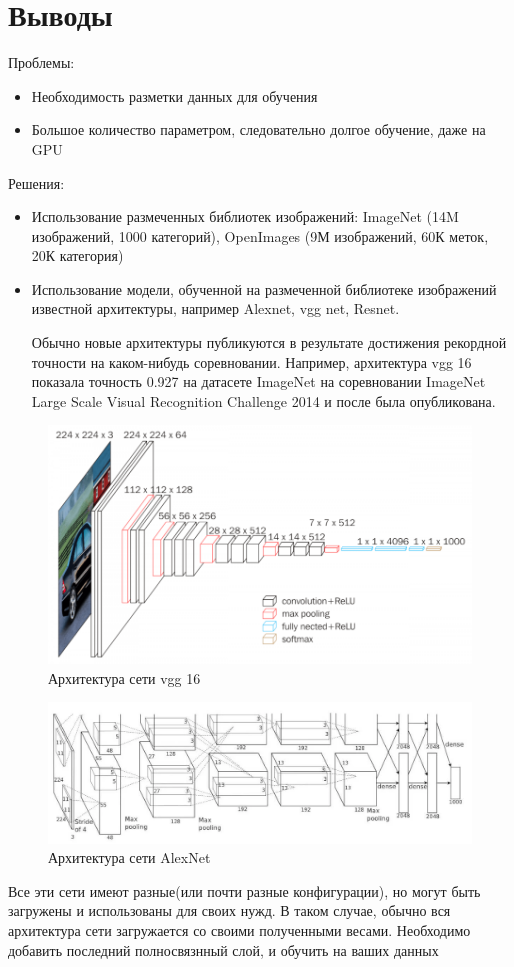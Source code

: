\documentclass{article}
\theoremstyle{definition}
\theoremstyle{theorem}
\theoremstyle{remark}
\theoremstyle{theorem}
\theoremstyle{example}
\theoremstyle{theorem}
\theoremstyle{theorem}
\theoremstyle{theorem}
\theoremstyle{theorem}
\begin{document}
	
	\section{Выводы}
		Проблемы:
		\begin{itemize}
			\item Необходимость разметки данных для обучения
			\item Большое количество параметром, следовательно долгое обучение, даже на GPU
		\end{itemize}
	Решения:
		\begin{itemize}
			\item Использование размеченных библиотек изображений: ImageNet (14M изображений, 1000 категорий), OpenImages (9М изображений, 60К меток, 20К категория)
			\item Использование модели, обученной на размеченной библиотеке изображений известной архитектуры, например Alexnet, vgg net, Resnet. 
			
		Обычно новые архитектуры публикуются в результате достижения рекордной точности на каком-нибудь соревновании. Например, архитектура vgg 16 показала точность 0.927 на датасете ImageNet на соревновании ImageNet Large Scale Visual Recognition Challenge 2014 и после была опубликована.
		\end{itemize}
		\begin{figure}[h!]
			\includegraphics[width=\textwidth]{vgg16.png}\caption{Архитектура сети vgg 16}
		\end{figure}
		\begin{figure}[h!]
			\includegraphics[width=\textwidth]{AlexNet.png}\caption{Архитектура сети AlexNet}
		\end{figure}
		Все эти сети имеют разные(или почти разные конфигурации), но могут быть загружены и использованы для своих нужд. В таком случае, обычно вся архитектура сети загружается со своими полученными весами. Необходимо добавить последний полносвязнный слой, и обучить на ваших данных
\end{document}
